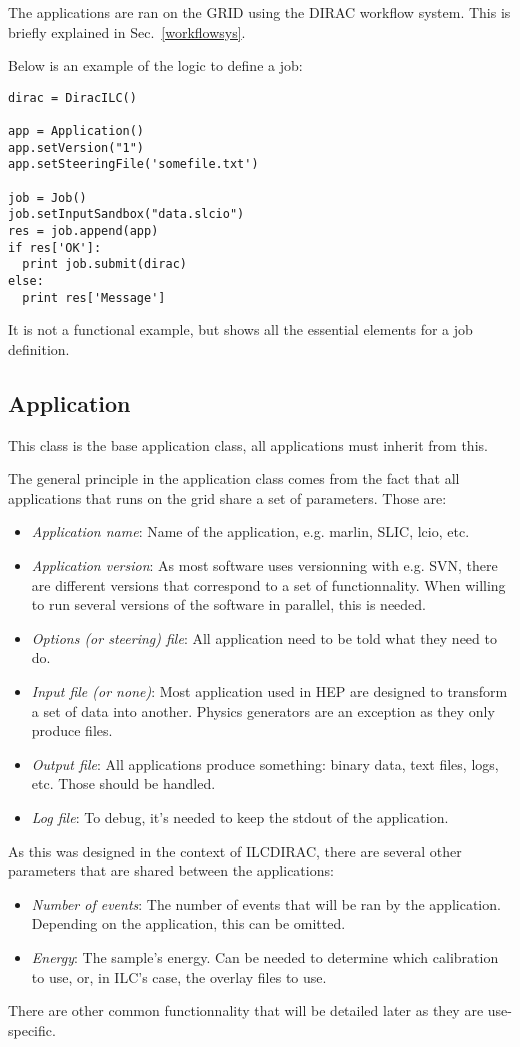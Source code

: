 \documentclass[a4paper,12pt]{article}
\begin{document}
The applications are ran on the GRID using the DIRAC workflow system. This is
briefly explained in Sec.~\ref{workflowsys}.

Below is an example of the logic to define a job:
\begin{lstlisting}[basicstyle=\normalsize]
dirac = DiracILC()

app = Application()
app.setVersion("1")
app.setSteeringFile('somefile.txt')

job = Job()
job.setInputSandbox("data.slcio")
res = job.append(app)
if res['OK']:
  print job.submit(dirac)
else:
  print res['Message'] 
\end{lstlisting}
It is not a functional example, but shows all the essential elements for a job definition.

\subsection{Application}\label{application}
This class is the base application class, all applications must inherit from
this. 

The general principle in the application class comes from the fact that all
applications that runs on the grid share a set of parameters. Those are:
\begin{itemize}
  \item \emph{Application name}: Name of the application, e.g. marlin, SLIC,
  lcio, etc.
  \item \emph{Application version}: As most software uses versionning with e.g.
  SVN, there are different versions that correspond to a set of functionnality. When
  willing to run several versions of the software in parallel, this is needed.
  \item \emph{Options (or steering) file}: All application need to be told what
  they need to do. 
  \item \emph{Input file (or none)}: Most application used in HEP are designed
  to transform a set of data into another. Physics generators are an exception as
  they only produce files.
  \item \emph{Output file}: All applications produce something: binary data,
  text files, logs, etc. Those should be handled.
  \item \emph{Log file}: To debug, it's needed to keep the stdout of the
  application.
\end{itemize}
As this was designed in the context of ILCDIRAC, there are several other
parameters that are shared between the applications:
\begin{itemize}
  \item \emph{Number of events}: The number of events that will be ran by the
  application. Depending on the application, this can be omitted.
  \item \emph{Energy}: The sample's energy. Can be needed to determine which
  calibration to use, or, in ILC's case, the overlay files to use.
\end{itemize}
There are other common functionnality that will be detailed later as they are
use-specific.
\end{document}
